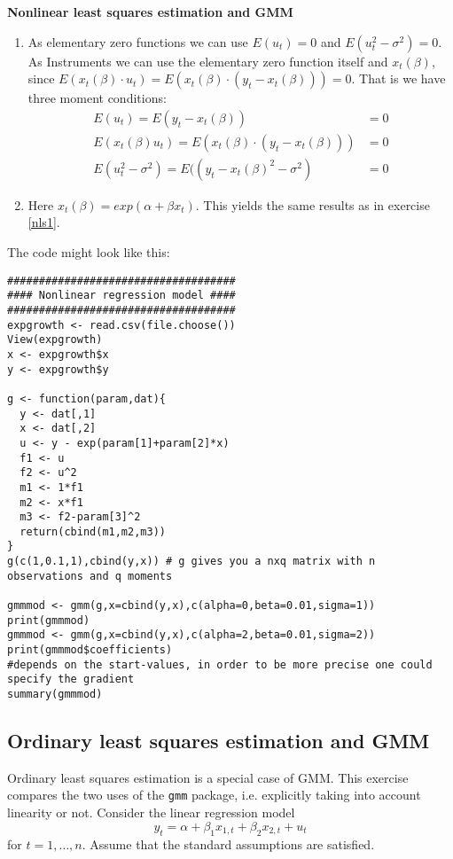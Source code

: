 \documentclass{article}
\begin{document}
\begin{solution}
\textbf{Nonlinear least squares estimation and GMM}

\begin{enumerate}
  \item As elementary zero functions we can use $E(u_t)=0$ and $E(u_t^2-\sigma^2)=0$. As Instruments we can use the elementary zero function itself and $x_t(\beta)$, since $E(x_t(\beta)\cdot u_t)=E(x_t(\beta)\cdot (y_t-x_t(\beta)))=0$. That is we have three moment conditions:
      \begin{align*}
      E(u_t) = E(y_t-x_t(\beta)) &= 0\\
      E(x_t(\beta) u_t) = E(x_t(\beta)\cdot (y_t-x_t(\beta)))&= 0\\
      E(u_t^2-\sigma^2) = E((y_t-x_t(\beta)^2-\sigma^2) &=0
      \end{align*}
  \item Here $x_t(\beta)=exp(\alpha+\beta x_t)$. This yields the same results as in exercise \ref{nls1}.
\end{enumerate}
The code might look like this:
\begin{verbatim}
####################################
#### Nonlinear regression model ####
####################################
expgrowth <- read.csv(file.choose())
View(expgrowth)
x <- expgrowth$x
y <- expgrowth$y

g <- function(param,dat){
  y <- dat[,1]
  x <- dat[,2]
  u <- y - exp(param[1]+param[2]*x)
  f1 <- u
  f2 <- u^2
  m1 <- 1*f1
  m2 <- x*f1
  m3 <- f2-param[3]^2
  return(cbind(m1,m2,m3))
}
g(c(1,0.1,1),cbind(y,x)) # g gives you a nxq matrix with n observations and q moments

gmmmod <- gmm(g,x=cbind(y,x),c(alpha=0,beta=0.01,sigma=1))
print(gmmmod)
gmmmod <- gmm(g,x=cbind(y,x),c(alpha=2,beta=0.01,sigma=2))
print(gmmmod$coefficients)
#depends on the start-values, in order to be more precise one could specify the gradient
summary(gmmmod)
\end{verbatim}
\end{solution}


\subsection{Ordinary least squares estimation and GMM}
Ordinary least squares estimation is a special case of GMM. This exercise compares the two uses of the \texttt{gmm} package, i.e. explicitly taking into account linearity or not. Consider the
linear regression model%
\begin{equation*}
y_{t}= \alpha + \beta_1 x_{1,t} + \beta_2 x_{2,t} + u_t
\end{equation*}%
for $t=1,\dots,n$. Assume that the standard assumptions are satisfied.
\end{document}
